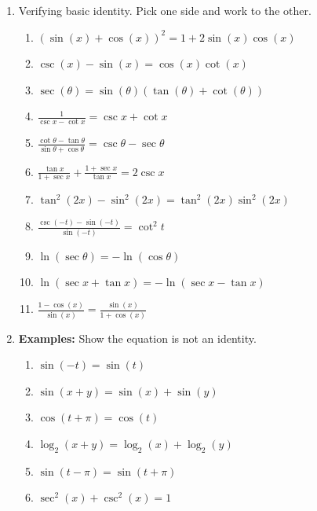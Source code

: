 \documentclass{article}
\newcommand{\ds}{\displaystyle}
\begin{document}
\begin{enumerate}
\item Verifying basic identity. Pick one side and work to the other.
\begin{enumerate}
\item $\left(\sin(x)+\cos(x)\right)^2 = 1 + 2\sin(x)\cos(x)$
\item $\csc(x)-\sin(x)=\cos(x)\cot(x)$
\item $\sec(\theta) = \sin(\theta)(\tan(\theta)+\cot(\theta))$
\item $\displaystyle \frac{1}{\csc x-\cot x} = \csc x+\cot x$
\item $\displaystyle \frac{\cot\theta-\tan\theta}{\sin\theta+\cos \theta}= \csc\theta-\sec\theta$
\item $\displaystyle \frac{\tan x}{1+\sec x}+\frac{1+\sec x}{\tan x} = 2\csc x$
\item $\displaystyle \tan^2 (2x)-\sin^2 (2x) = \tan^2(2x)\sin^2(2x)$
\item $\displaystyle \frac{\csc(-t)-\sin(-t)}{\sin(-t)} = \cot^2t$
\item $\displaystyle \ln (\sec\theta) = -\ln (\cos\theta)$
\item $\ds \ln(\sec x+\tan x) = -\ln (\sec x-\tan x)$
\item $\ds \frac{1-\cos(x)}{\sin(x)} = \frac{\sin(x)}{1+\cos(x)}$
\end{enumerate}

\item {\bf Examples:} Show the equation is not an identity.
\begin{enumerate}
\item $\sin(-t) = \sin(t)$
\item $\sin(x+y) = \sin(x)+\sin(y)$
\item $\cos(t+\pi) = \cos(t)$
\item $\log_2(x+y) = \log_2(x)+\log_2(y)$
\item $\sin(t-\pi) = \sin(t+\pi)$
\item $\sec^2(x)+\csc^2(x)=1$
\end{enumerate}

\end{enumerate}


\end{document}
